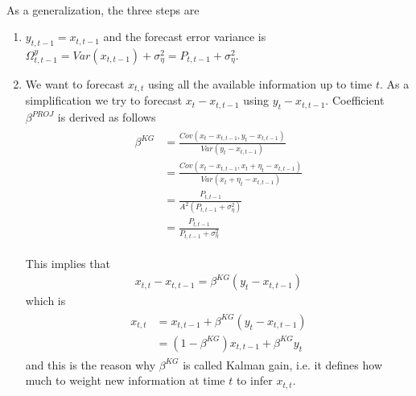 \documentclass[14pt]{article}
\begin{document}
\ 

As a generalization, the three steps are
\begin{enumerate}
	\item $y_{t,t-1} = x_{t,t-1}$ and the forecast error variance is $\Omega^y_{t,t-1} = Var(x_{t,t-1}) + \sigma^2_{\eta} = P_{t,t-1} + \sigma^2_{\eta}$.
	\item We want to forecast $x_{t,t}$ using all the available information up to time $t$. As a simplification we try to forecast $x_{t} -  x_{t,t-1}$ using $y_t -  x_{t,t-1}$.
	Coefficient $\beta^{PROJ}$ is derived as follows
	\begin{eqnarray}
	\begin{aligned}
	\beta^{KG} &= \frac{Cov(x_t -  x_{t,t-1}, y_t - x_{t,t-1})}{Var(y_t -  x_{t,t-1})}  \\
	             &= \frac{Cov(x_t - x_{t,t-1},  x_t + \eta_t -  x_{t,t-1})}{Var( x_t + \eta_t - x_{t,t-1})} \\
	             &= \frac{ P_{t,t-1}}{A^2 ( P_{t,t-1} + \sigma^2_{\eta})} \\
	             &= \frac{P_{t,t-1}}{P_{t,t-1} + \sigma^2_{\eta}} 
	\end{aligned}
	\end{eqnarray}
	
	This implies that
	\begin{eqnarray}
	x_{t,t} - x_{t,t-1} = \beta^{KG} (y_t - x_{t,t-1})
	\end{eqnarray}
	which is
		\begin{eqnarray}
			\begin{aligned}
	x_{t,t} &= x_{t,t-1} +  \beta^{KG} (y_t - x_{t,t-1}) \\
	&= (1 - \beta^{KG})  x_{t,t-1} +  \beta^{KG}  y_t
		\end{aligned}
	\end{eqnarray}
	and this is the reason why $\beta^{KG}$ is called Kalman gain, i.e. it defines how much to weight new information at time $t$ to infer $x_{t,t}$.
	

\end{enumerate}
\end{document}
